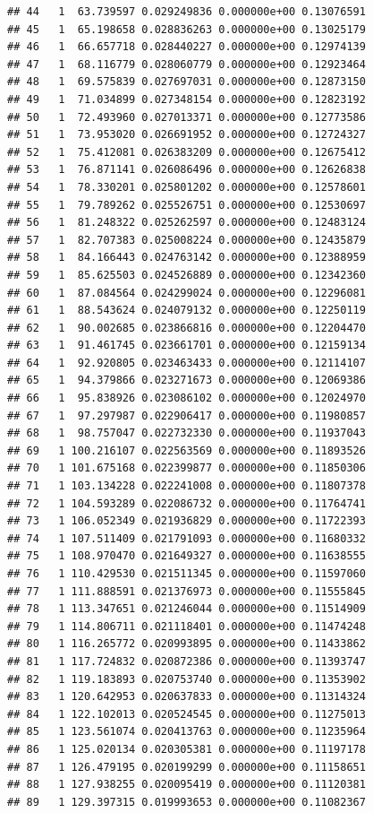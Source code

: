 \documentclass[article]{jss}\usepackage[]{graphicx}\usepackage[]{xcolor}
\makeatletter
\newenvironment{kframe}{%
 \def\at@end@of@kframe{}%
 \ifinner\ifhmode%
  \def\at@end@of@kframe{\end{minipage}}%
  \begin{minipage}{\columnwidth}%
 \fi\fi%
 \def\FrameCommand##1{\hskip\@totalleftmargin \hskip-\fboxsep
 \colorbox{shadecolor}{##1}\hskip-\fboxsep
     \hskip-\linewidth \hskip-\@totalleftmargin \hskip\columnwidth}%
 \MakeFramed {\advance\hsize-\width
   \@totalleftmargin\z@ \linewidth\hsize
   \@setminipage}}%
 {\par\unskip\endMakeFramed%
 \at@end@of@kframe}
\newenvironment{knitrout}{}{} %
\makeatother
\begin{document}
\begin{knitrout}
\begin{kframe}
\begin{verbatim}
## 44   1  63.739597 0.029249836 0.000000e+00 0.13076591
## 45   1  65.198658 0.028836263 0.000000e+00 0.13025179
## 46   1  66.657718 0.028440227 0.000000e+00 0.12974139
## 47   1  68.116779 0.028060779 0.000000e+00 0.12923464
## 48   1  69.575839 0.027697031 0.000000e+00 0.12873150
## 49   1  71.034899 0.027348154 0.000000e+00 0.12823192
## 50   1  72.493960 0.027013371 0.000000e+00 0.12773586
## 51   1  73.953020 0.026691952 0.000000e+00 0.12724327
## 52   1  75.412081 0.026383209 0.000000e+00 0.12675412
## 53   1  76.871141 0.026086496 0.000000e+00 0.12626838
## 54   1  78.330201 0.025801202 0.000000e+00 0.12578601
## 55   1  79.789262 0.025526751 0.000000e+00 0.12530697
## 56   1  81.248322 0.025262597 0.000000e+00 0.12483124
## 57   1  82.707383 0.025008224 0.000000e+00 0.12435879
## 58   1  84.166443 0.024763142 0.000000e+00 0.12388959
## 59   1  85.625503 0.024526889 0.000000e+00 0.12342360
## 60   1  87.084564 0.024299024 0.000000e+00 0.12296081
## 61   1  88.543624 0.024079132 0.000000e+00 0.12250119
## 62   1  90.002685 0.023866816 0.000000e+00 0.12204470
## 63   1  91.461745 0.023661701 0.000000e+00 0.12159134
## 64   1  92.920805 0.023463433 0.000000e+00 0.12114107
## 65   1  94.379866 0.023271673 0.000000e+00 0.12069386
## 66   1  95.838926 0.023086102 0.000000e+00 0.12024970
## 67   1  97.297987 0.022906417 0.000000e+00 0.11980857
## 68   1  98.757047 0.022732330 0.000000e+00 0.11937043
## 69   1 100.216107 0.022563569 0.000000e+00 0.11893526
## 70   1 101.675168 0.022399877 0.000000e+00 0.11850306
## 71   1 103.134228 0.022241008 0.000000e+00 0.11807378
## 72   1 104.593289 0.022086732 0.000000e+00 0.11764741
## 73   1 106.052349 0.021936829 0.000000e+00 0.11722393
## 74   1 107.511409 0.021791093 0.000000e+00 0.11680332
## 75   1 108.970470 0.021649327 0.000000e+00 0.11638555
## 76   1 110.429530 0.021511345 0.000000e+00 0.11597060
## 77   1 111.888591 0.021376973 0.000000e+00 0.11555845
## 78   1 113.347651 0.021246044 0.000000e+00 0.11514909
## 79   1 114.806711 0.021118401 0.000000e+00 0.11474248
## 80   1 116.265772 0.020993895 0.000000e+00 0.11433862
## 81   1 117.724832 0.020872386 0.000000e+00 0.11393747
## 82   1 119.183893 0.020753740 0.000000e+00 0.11353902
## 83   1 120.642953 0.020637833 0.000000e+00 0.11314324
## 84   1 122.102013 0.020524545 0.000000e+00 0.11275013
## 85   1 123.561074 0.020413763 0.000000e+00 0.11235964
## 86   1 125.020134 0.020305381 0.000000e+00 0.11197178
## 87   1 126.479195 0.020199299 0.000000e+00 0.11158651
## 88   1 127.938255 0.020095419 0.000000e+00 0.11120381
## 89   1 129.397315 0.019993653 0.000000e+00 0.11082367

\end{verbatim}
\end{kframe}
\end{knitrout}
\end{document}
